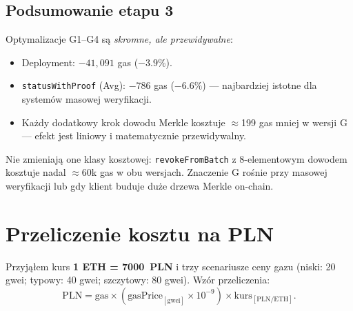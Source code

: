 \documentclass[11pt,a4paper]{article}
\newcommand{\EthPln}{7000}
\begin{document}
\subsection{Podsumowanie etapu 3}

Optymalizacje G1--G4 są \emph{skromne, ale przewidywalne}:
\begin{itemize}
  \item Deployment: $-41{,}091$ gas ($-3.9\%$).
  \item \texttt{statusWithProof} (Avg): $-786$ gas ($-6.6\%$) ---
        najbardziej istotne dla systemów masowej weryfikacji.
  \item Każdy dodatkowy krok dowodu Merkle kosztuje $\approx$199 gas mniej
        w wersji G --- efekt jest liniowy i matematycznie przewidywalny.
\end{itemize}

Nie zmieniają one klasy kosztowej: \texttt{revokeFromBatch}
z 8-elementowym dowodem kosztuje nadal $\approx$60k gas w obu wersjach.
Znaczenie G rośnie przy masowej weryfikacji lub gdy klient buduje
duże drzewa Merkle on-chain.

\section{Przeliczenie kosztu na PLN}

Przyjąłem kurs \textbf{1 ETH = \EthPln\ PLN} i trzy scenariusze ceny gazu
(niski: 20 gwei; typowy: 40 gwei; szczytowy: 80 gwei).
Wzór przeliczenia:
\[
\text{PLN} = \text{gas} \times (\text{gasPrice}_{[\text{gwei}]} \times 10^{-9})
             \times \text{kurs}_{[\text{PLN/ETH}]}.
\]
\end{document}
